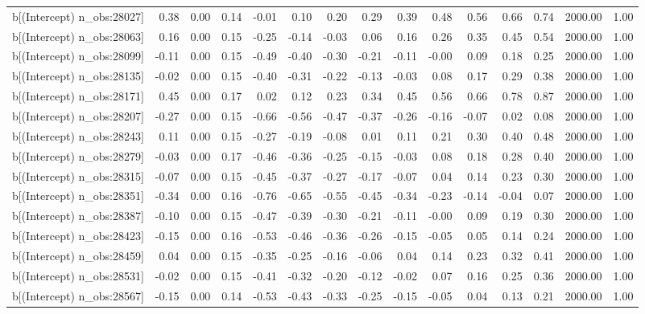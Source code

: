 \begin{table}[ht]
\begin{tabular}{rrrrrrrrrrrrrrr}
  b[(Intercept) n\_obs:28027] & 0.38 & 0.00 & 0.14 & -0.01 & 0.10 & 0.20 & 0.29 & 0.39 & 0.48 & 0.56 & 0.66 & 0.74 & 2000.00 & 1.00 \\ 
  b[(Intercept) n\_obs:28063] & 0.16 & 0.00 & 0.15 & -0.25 & -0.14 & -0.03 & 0.06 & 0.16 & 0.26 & 0.35 & 0.45 & 0.54 & 2000.00 & 1.00 \\ 
  b[(Intercept) n\_obs:28099] & -0.11 & 0.00 & 0.15 & -0.49 & -0.40 & -0.30 & -0.21 & -0.11 & -0.00 & 0.09 & 0.18 & 0.25 & 2000.00 & 1.00 \\ 
  b[(Intercept) n\_obs:28135] & -0.02 & 0.00 & 0.15 & -0.40 & -0.31 & -0.22 & -0.13 & -0.03 & 0.08 & 0.17 & 0.29 & 0.38 & 2000.00 & 1.00 \\ 
  b[(Intercept) n\_obs:28171] & 0.45 & 0.00 & 0.17 & 0.02 & 0.12 & 0.23 & 0.34 & 0.45 & 0.56 & 0.66 & 0.78 & 0.87 & 2000.00 & 1.00 \\ 
  b[(Intercept) n\_obs:28207] & -0.27 & 0.00 & 0.15 & -0.66 & -0.56 & -0.47 & -0.37 & -0.26 & -0.16 & -0.07 & 0.02 & 0.08 & 2000.00 & 1.00 \\ 
  b[(Intercept) n\_obs:28243] & 0.11 & 0.00 & 0.15 & -0.27 & -0.19 & -0.08 & 0.01 & 0.11 & 0.21 & 0.30 & 0.40 & 0.48 & 2000.00 & 1.00 \\ 
  b[(Intercept) n\_obs:28279] & -0.03 & 0.00 & 0.17 & -0.46 & -0.36 & -0.25 & -0.15 & -0.03 & 0.08 & 0.18 & 0.28 & 0.40 & 2000.00 & 1.00 \\ 
  b[(Intercept) n\_obs:28315] & -0.07 & 0.00 & 0.15 & -0.45 & -0.37 & -0.27 & -0.17 & -0.07 & 0.04 & 0.14 & 0.23 & 0.30 & 2000.00 & 1.00 \\ 
  b[(Intercept) n\_obs:28351] & -0.34 & 0.00 & 0.16 & -0.76 & -0.65 & -0.55 & -0.45 & -0.34 & -0.23 & -0.14 & -0.04 & 0.07 & 2000.00 & 1.00 \\ 
  b[(Intercept) n\_obs:28387] & -0.10 & 0.00 & 0.15 & -0.47 & -0.39 & -0.30 & -0.21 & -0.11 & -0.00 & 0.09 & 0.19 & 0.30 & 2000.00 & 1.00 \\ 
  b[(Intercept) n\_obs:28423] & -0.15 & 0.00 & 0.16 & -0.53 & -0.46 & -0.36 & -0.26 & -0.15 & -0.05 & 0.05 & 0.14 & 0.24 & 2000.00 & 1.00 \\ 
  b[(Intercept) n\_obs:28459] & 0.04 & 0.00 & 0.15 & -0.35 & -0.25 & -0.16 & -0.06 & 0.04 & 0.14 & 0.23 & 0.32 & 0.41 & 2000.00 & 1.00 \\ 
  b[(Intercept) n\_obs:28531] & -0.02 & 0.00 & 0.15 & -0.41 & -0.32 & -0.20 & -0.12 & -0.02 & 0.07 & 0.16 & 0.25 & 0.36 & 2000.00 & 1.00 \\ 
  b[(Intercept) n\_obs:28567] & -0.15 & 0.00 & 0.14 & -0.53 & -0.43 & -0.33 & -0.25 & -0.15 & -0.05 & 0.04 & 0.13 & 0.21 & 2000.00 & 1.00 \\ 

\end{tabular}
\end{table}
